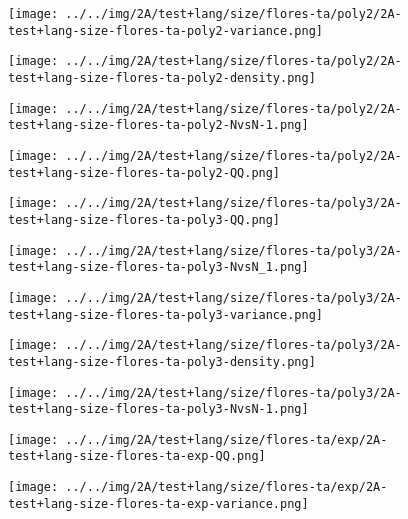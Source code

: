 \begin{figure}[H]
\centering	\texttt{[image: ../../img/2A/test+lang/size/flores-ta/poly2/2A-test+lang-size-flores-ta-poly2-variance.png]}
\end{figure}
\begin{figure}[H]
\centering	\texttt{[image: ../../img/2A/test+lang/size/flores-ta/poly2/2A-test+lang-size-flores-ta-poly2-density.png]}
\end{figure}
\begin{figure}[H]
\centering	\texttt{[image: ../../img/2A/test+lang/size/flores-ta/poly2/2A-test+lang-size-flores-ta-poly2-NvsN-1.png]}
\end{figure}
\begin{figure}[H]
\centering	\texttt{[image: ../../img/2A/test+lang/size/flores-ta/poly2/2A-test+lang-size-flores-ta-poly2-QQ.png]}
\end{figure}
\begin{figure}[H]
\centering	\texttt{[image: ../../img/2A/test+lang/size/flores-ta/poly3/2A-test+lang-size-flores-ta-poly3-QQ.png]}
\end{figure}
\begin{figure}[H]
\centering	\texttt{[image: ../../img/2A/test+lang/size/flores-ta/poly3/2A-test+lang-size-flores-ta-poly3-NvsN\_1.png]}
\end{figure}
\begin{figure}[H]
\centering	\texttt{[image: ../../img/2A/test+lang/size/flores-ta/poly3/2A-test+lang-size-flores-ta-poly3-variance.png]}
\end{figure}
\begin{figure}[H]
\centering	\texttt{[image: ../../img/2A/test+lang/size/flores-ta/poly3/2A-test+lang-size-flores-ta-poly3-density.png]}
\end{figure}
\begin{figure}[H]
\centering	\texttt{[image: ../../img/2A/test+lang/size/flores-ta/poly3/2A-test+lang-size-flores-ta-poly3-NvsN-1.png]}
\end{figure}
\begin{figure}[H]
\centering	\texttt{[image: ../../img/2A/test+lang/size/flores-ta/exp/2A-test+lang-size-flores-ta-exp-QQ.png]}
\end{figure}
\begin{figure}[H]
\centering	\texttt{[image: ../../img/2A/test+lang/size/flores-ta/exp/2A-test+lang-size-flores-ta-exp-variance.png]}
\end{figure}
